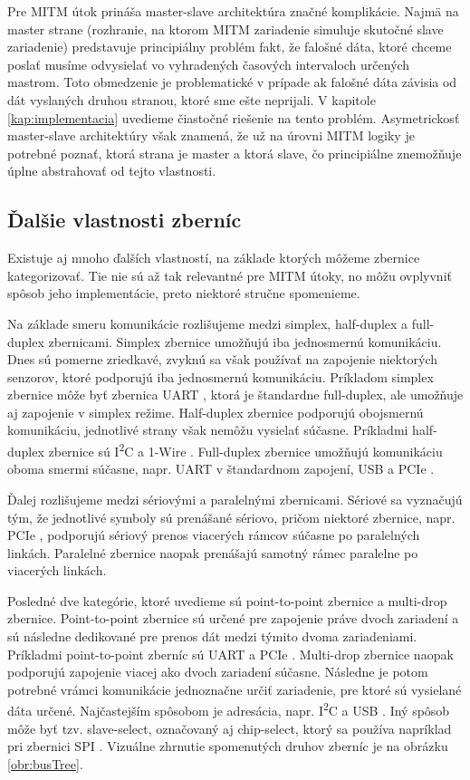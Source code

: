 Pre MITM útok prináša master-slave architektúra značné komplikácie. Najmä na master strane (rozhranie, na ktorom MITM zariadenie simuluje skutočné slave zariadenie) predstavuje principiálny problém fakt, že falošné dáta, ktoré chceme poslať musíme odvysielať vo vyhradených časových intervaloch určených mastrom. Toto obmedzenie je problematické v prípade ak falošné dáta závisia od dát vyslaných druhou stranou, ktoré sme ešte neprijali. V kapitole \ref{kap:implementacia} uvedieme čiastočné riešenie na tento problém. Asymetrickosť master-slave architektúry však znamená, že už na úrovni MITM logiky je potrebné poznať, ktorá strana je master a ktorá slave, čo principiálne znemožňuje úplne abstrahovať od tejto vlastnosti.

\subsection{Ďalšie vlastnosti zberníc}
Existuje aj mnoho ďalších vlastností, na základe ktorých môžeme zbernice kategorizovať. Tie nie sú až tak relevantné pre MITM útoky, no môžu ovplyvniť spôsob jeho implementácie, preto niektoré stručne spomenieme.

Na základe smeru komunikácie rozlišujeme medzi simplex, half-duplex a full-duplex zbernicami. Simplex zbernice umožňujú iba jednosmernú komunikáciu. Dnes sú pomerne zriedkavé, zvyknú sa však používať na zapojenie niektorých senzorov, ktoré podporujú iba jednosmernú komunikáciu. Príkladom simplex zbernice môže byť zbernica UART \cite{uartBus}, ktorá je štandardne full-duplex, ale umožňuje aj zapojenie v simplex režime. Half-duplex zbernice podporujú obojsmernú komunikáciu, jednotlivé strany však nemôžu vysielať súčasne. Príkladmi half-duplex zbernice sú I\textsuperscript{2}C \cite{i2cSpec} a 1-Wire \cite{1wireBus}. Full-duplex zbernice umožňujú komunikáciu oboma smermi súčasne, napr. UART \cite{uartBus} v štandardnom zapojení, USB \cite{usbSpec} a PCIe \cite{pcieSpec}.

Ďalej rozlišujeme medzi sériovými a paralelnými zbernicami. Sériové sa vyznačujú tým, že jednotlivé symboly sú prenášané sériovo, pričom niektoré zbernice, napr. PCIe \cite{pcieSpec}, podporujú sériový prenos viacerých rámcov súčasne po paralelných linkách. Paralelné zbernice naopak prenášajú samotný rámec paralelne po viacerých linkách.

Posledné dve kategórie, ktoré uvedieme sú point-to-point zbernice a multi-drop zbernice. Point-to-point zbernice sú určené pre zapojenie práve dvoch zariadení a sú následne dedikované pre prenos dát medzi týmito dvoma zariadeniami. Príkladmi point-to-point zberníc sú UART \cite{uartBus} a PCIe \cite{pcieSpec}. Multi-drop zbernice naopak podporujú zapojenie viacej ako dvoch zariadení súčasne. Následne je potom potrebné vrámci komunikácie jednoznačne určiť zariadenie, pre ktoré sú vysielané dáta určené. Najčastejším spôsobom je adresácia, napr. I\textsuperscript{2}C \cite{i2cSpec} a USB \cite{usbSpec}. Iný spôsob môže byť tzv. slave-select, označovaný aj chip-select, ktorý sa používa napríklad pri zbernici SPI \cite{spiBus}. Vizuálne zhrnutie spomenutých druhov zberníc je na obrázku \ref{obr:busTree}.

